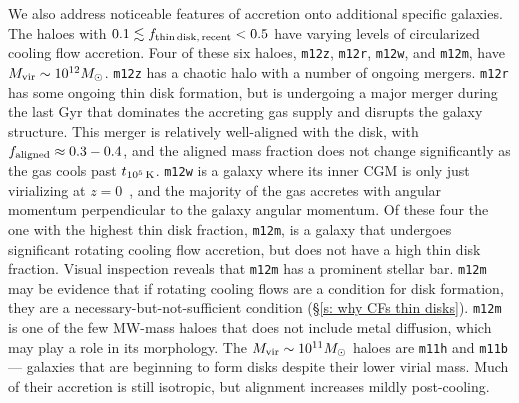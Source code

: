 \documentclass[fleqn,usenatbib]{mnras}
\newcommand{\fthin}{f_{\rm thin\,disk,\,recent}}
\newcommand{\tcools}{t_{10^5\,{\rm K}}}
\begin{document}
We also address noticeable features of accretion onto additional specific galaxies.
The haloes with $0.1 \lesssim \fthin < 0.5$ have varying levels of circularized cooling flow accretion.
Four of these six haloes, \texttt{m12z}, \texttt{m12r}, \texttt{m12w}, and \texttt{m12m}, have $M_{\rm vir} \sim 10^{12} M_\odot$.
\texttt{m12z} has a chaotic halo with a number of ongoing mergers.
\texttt{m12r} has some ongoing thin disk formation, but is undergoing a major merger during the last Gyr that dominates the accreting gas supply and disrupts the galaxy structure.
This merger is relatively well-aligned with the disk, with $f_{\rm aligned} \approx 0.3-0.4$, and the aligned mass fraction does not change significantly as the gas cools past $\tcools$.
\texttt{m12w} is a galaxy where its inner CGM is only just virializing at $z=0$~\citep{Yu2021}, and the majority of the gas accretes with angular momentum perpendicular to the galaxy angular momentum.
Of these four the one with the highest thin disk fraction, \texttt{m12m}, is a galaxy that undergoes significant rotating cooling flow accretion, but does not have a high thin disk fraction.
Visual inspection reveals that \texttt{m12m} has a prominent stellar bar.
\texttt{m12m} may be evidence that if rotating cooling flows are a condition for disk formation, they are a necessary-but-not-sufficient condition (\S\ref{s: why CFs thin disks}).
\texttt{m12m} is one of the few MW-mass haloes that does not include metal diffusion, which may play a role in its morphology.
The $M_{\rm vir} \sim 10^{11} M_\odot$ haloes are \texttt{m11h} and \texttt{m11b} --- galaxies that are beginning to form disks despite their lower virial mass.
Much of their accretion is still isotropic, but alignment increases mildly post-cooling.


\bsp	%
\label{lastpage}
\end{document}
